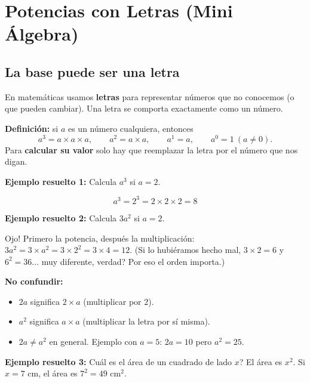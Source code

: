 \documentclass[12pt, letterpaper]{article}
\begin{document}
\newpage

\section{Potencias con Letras (Mini Álgebra)}

\subsection{La base puede ser una letra}

En matemáticas usamos \textbf{letras} para representar números que no conocemos (o que pueden cambiar). Una letra se comporta exactamente como un número.

\begin{cuadroteoria}
  \textbf{Definición:} si $a$ es un número cualquiera, entonces
  \[
    a^3 = a \times a \times a, \qquad a^2 = a \times a, \qquad a^1 = a, \qquad a^0 = 1 \ (a \neq 0).
  \]
  Para \textbf{calcular su valor} solo hay que reemplazar la letra por el número que nos digan.
\end{cuadroteoria}

\noindent\textbf{Ejemplo resuelto 1:} Calcula $a^3$ si $a = 2$.

\[
  a^3 = 2^3 = 2 \times 2 \times 2 = 8
\]

\noindent\textbf{Ejemplo resuelto 2:} Calcula $3a^2$ si $a = 2$.

\textquestiondown Ojo! Primero la potencia, después la multiplicación: $3a^2 = 3 \times a^2 = 3 \times 2^2 = 3 \times 4 = 12$. (Si lo hubiéramos hecho mal, $3 \times 2 = 6$ y $6^2 = 36$... \textquestiondown muy diferente, verdad? Por eso el orden importa.)

\begin{cuadroadvertencia}
  \textbf{No confundir:}
  \begin{itemize}
    \item $2a$ significa $2 \times a$ (multiplicar por $2$).
    \item $a^2$ significa $a \times a$ (multiplicar la letra por sí misma).
    \item $2a \neq a^2$ en general. Ejemplo con $a = 5$: $2a = 10$ pero $a^2 = 25$.
  \end{itemize}
\end{cuadroadvertencia}

\noindent\textbf{Ejemplo resuelto 3:} \textquestiondown Cuál es el área de un cuadrado de lado $x$? El área es $x^2$. Si $x = 7$ cm, el área es $7^2 = 49$ cm$^2$.
\end{document}
